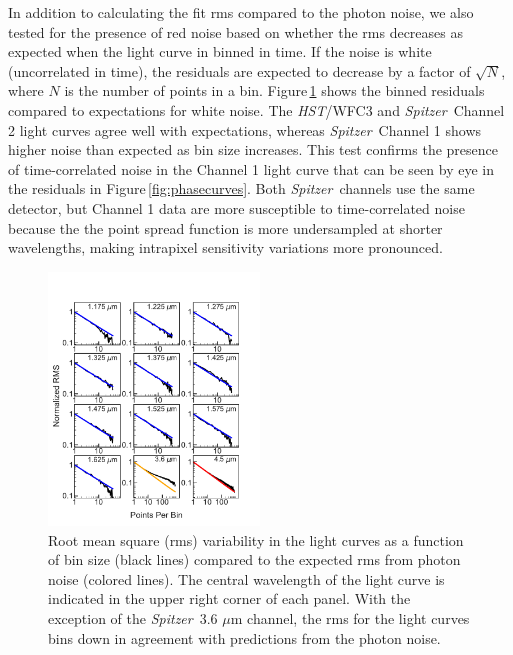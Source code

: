 \documentclass[twocolumn, trackchanges]{aastex61}
\newcommand{\project}[1]{\textsl{#1}}
\newcommand{\HST}{\project{HST}}
\newcommand{\Spitzer}{\project{Spitzer}}
\begin{document}
In addition to calculating the fit rms compared to the photon noise, we also tested for the presence of red noise based on whether the rms decreases as expected when the light curve in binned in time.  If the noise is white (uncorrelated in time), the residuals are expected to decrease by a factor of $\sqrt{N}$, where $N$ is the number of points in a bin. Figure\,\ref{fig:rms} shows the binned residuals compared to expectations for white noise. The \HST/WFC3 and \Spitzer\ Channel 2 light curves agree well with expectations, whereas \Spitzer\ Channel 1 shows higher noise than expected as bin size increases. This test confirms the presence of time-correlated noise in the Channel 1 light curve that can be seen by eye in the residuals in Figure\,\ref{fig:phasecurves}. Both \Spitzer\ channels use the same detector, but Channel 1 data are more susceptible to time-correlated noise because the the point spread function is more undersampled at shorter wavelengths, making intrapixel sensitivity variations more pronounced.


\begin{figure}
\includegraphics[width = 0.5\textwidth]{fig4.pdf}
\caption{Root mean square (rms) variability in the light curves as a function of bin size (black lines) compared to the expected rms from photon noise (colored lines). The central wavelength of the light curve is indicated in the upper right corner of each panel. With the exception of the \Spitzer\ 3.6 $\mu$m channel, the rms for the light curves bins down in agreement with predictions from the photon noise.}
\label{fig:rms}
\end{figure}
\end{document}
